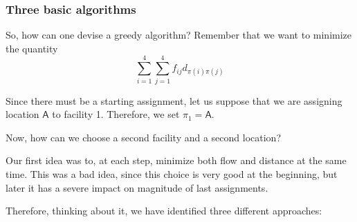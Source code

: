 \subsubsection{Three basic algorithms}
So, how can one devise a greedy algorithm?
Remember that we want to minimize the quantity
\[
\sum_{i=1}^4\sum_{j=1}^4f_{ij}d_{\pi(i)\pi(j)}
\]

\noindent Since there must be a starting assignment, let us suppose that we are assigning location $\mathsf A$ to facility 1. Therefore, we set $\pi_1 = \mathsf A$. 

Now, how can we choose a second facility and a second location? 

Our first idea was to, at each step, minimize both flow and distance at the same time. This was a bad idea, since this choice is very good at the beginning, but later it has a severe impact on magnitude of last assignments.

Therefore, thinking about it, we have identified three different approaches:


